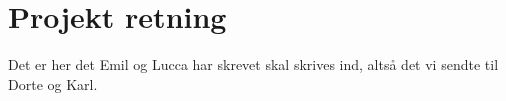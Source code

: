 \chapter{Projekt retning}
\label{ProjektRetning}
%
Det er her det Emil og Lucca har skrevet skal skrives ind, altså det vi sendte til Dorte og Karl. 